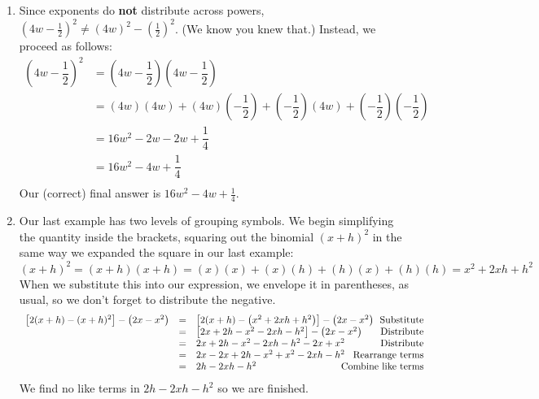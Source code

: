 {\begin{enumerate}
To our surprise and delight, this product reduces to $27y^3 - 2$.

\item Since exponents do \textbf{not} distribute across powers,  $\left(4w - \frac{1}{2} \right)^2 \neq (4w)^2 - \left(\frac{1}{2}\right)^2$.  (We know you knew that.)  Instead, we proceed as follows:
\begin{align*}
\left(4w - \dfrac{1}{2} \right)^2 & =  \left(4w - \dfrac{1}{2} \right)\left(4w - \dfrac{1}{2} \right)  \\
                                 & =  (4w)(4w) + (4w)\left(-\dfrac{1}{2}\right) + \left(-\dfrac{1}{2}\right)(4w) + \left(-\dfrac{1}{2}\right)\left(-\dfrac{1}{2}\right)  \\															
	& =  16w^2 - 2w - 2w + \dfrac{1}{4}  \tag*{Multiply} \\ 
                                & =  16w^2 - 4w + \dfrac{1}{4}   \tag*{Combine like terms} \\ 
\end{align*}
Our (correct) final answer is $16w^2 - 4w + \frac{1}{4}$.

\item  Our last example has two levels of grouping symbols.  We begin simplifying the quantity inside the brackets, squaring out the binomial $(x+h)^2$ in the same way we expanded the square in our last example: \[ (x+h)^2 = (x+h)(x+h) = (x)(x) + (x)(h) + (h)(x) + (h)(h) = x^2 + 2xh + h^2 \]  When we substitute this into our expression, we envelope it in parentheses, as usual, so we don't forget to distribute the negative.\[ \begin{array}{rclr}
					
\left[2(x+h) - (x+h)^2\right] - \left(2x - x^2 \right) & = & \left[2(x+h) - \left( x^2 + 2xh + h^2\right) \right] - \left(2x - x^2 \right) & \hspace*{-.6in}\text{Substitute} \\
	                                                     & = & \left[2x+2h - x^2-2xh-h^2\right] - \left(2x - x^2 \right) & \hspace*{-6in} \text{Distribute}\\ 
                                                      & = & 2x+2h - x^2-2xh-h^2 -2x + x^2 & \hspace*{-.6in}\text{Distribute} \\ 
																											 & = & 2x - 2x+2h - x^2 + x^2 -2xh-h^2& \hspace*{-.6in}\text{Rearrange terms}\\
																											 & = & 2h-2xh-h^2& \hspace*{-.6in}\text{Combine like terms}\\
																											\end{array} \] We find no like terms in $2h-2xh-h^2$ so we are finished.                                           

\end{enumerate}
}



